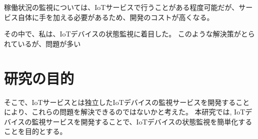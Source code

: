 稼働状況の監視については、IoTサービスで行うことがある程度可能だが、サービス自体に手を加える必要があるため、開発のコストが高くなる。

その中で、私は、IoTデバイスの状態監視に着目した。
このような解決策がとられているが、問題が多い

\section{研究の目的}
そこで、IoTサービスとは独立したIoTデバイスの監視サービスを開発することにより、これらの問題を解決できるのではないかと考えた。
本研究では, IoTデバイスの監視サービスを開発することで、IoTデバイスの状態監視を簡単化することを目的とする。

